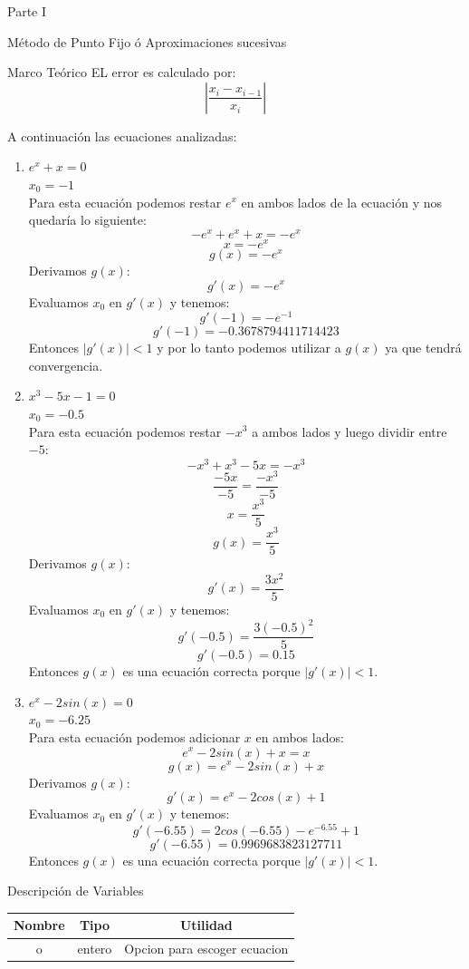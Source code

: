 \documentclass[legalpaper, 12pt]{article}
\def \eqa {\(e^x + x = 0\)}
\def \eqb {\(x^3 - 5x - 1 = 0\)}
\def \eqc {\(e^x - 2sin(x) = 0\)}
\begin{document}
\begin{section}{Parte I}
\begin{subsection}{Método de Punto Fijo ó Aproximaciones sucesivas}
\begin{subsubsection}{Marco Teórico}
        EL error es calculado por:
        \[\left|\frac{x_i-x_{i-1}}{x_i}\right|\]

        A continuación las ecuaciones analizadas:
        \begin{enumerate}
          \item \eqa\\$x_0=-1$\\
          Para esta ecuación podemos restar $e^x$ en ambos lados de la ecuación y nos quedaría lo siguiente:
          \[-e^x+e^x+x=-e^x\]
          \[x=-e^x\]
          \[g(x)=-e^x\]
          Derivamos $g(x)$:
          \[g'(x)=-e^x\]
          Evaluamos $x_0$ en $g'(x)$ y tenemos:
          \[g'(-1)=-e^{-1}\]
          \[g'(-1)=-0.3678794411714423\]
          Entonces $|g'(x)| < 1$ y por lo tanto podemos utilizar a $g(x)$ ya que tendrá convergencia.
          \item \eqb\\$x_0=-0.5$\\
          Para esta ecuación podemos restar $-x^3$ a ambos lados y luego dividir entre $-5$:
          \[-x^3+x^3-5x=-x^3\]
          \[\frac{-5x}{-5}=\frac{-x^3}{-5}\]
          \[x=\frac{x^3}{5}\]
          \[g(x)=\frac{x^3}{5}\]
          Derivamos $g(x)$:
          \[g'(x)=\frac{3x^2}{5}\]
          Evaluamos $x_0$ en $g'(x)$ y tenemos:
          \[g'(-0.5)=\frac{3(-0.5)^2}{5}\]
          \[g'(-0.5)=0.15\]
          Entonces $g(x)$ es una ecuación correcta porque $|g'(x)| < 1$.
          \item \eqc\\$x_0=-6.25$\\
          Para esta ecuación podemos adicionar $x$ en ambos lados:
          \[e^x -2sin(x) +x = x\]
          \[g(x) = e^x - 2sin(x) +x\]
          Derivamos $g(x)$:
          \[g'(x) = e^x-2cos(x)+1\]
          Evaluamos $x_0$ en $g'(x)$ y tenemos:
          \[g'(-6.55) = 2cos(-6.55)-e^{-6.55}+1\]
          \[g'(-6.55) = 0.9969683823127711\]
          Entonces $g(x)$ es una ecuación correcta porque $|g'(x)| < 1$.
        \end{enumerate}
      \end{subsubsection}
      \begin{subsubsection}{Descripción de Variables}
        \begin{table}[h]
          \centering
          \begin{tabular}{|c c c|}
            \hline
            Nombre & Tipo & Utilidad\\
            \hline\hline
            o & entero & Opcion para escoger ecuacion \\

\end{tabular}
\end{table}
\end{subsubsection}
\end{subsection}
\end{section}
\end{document}
